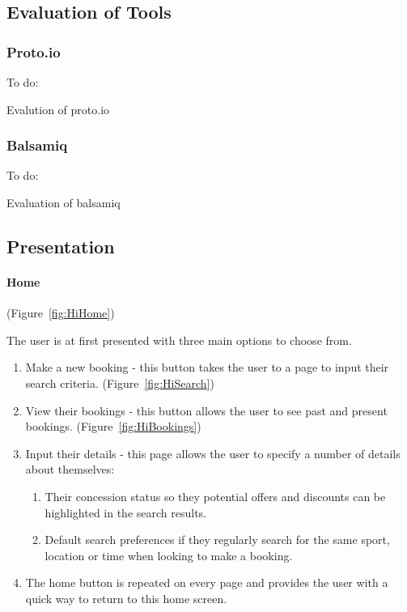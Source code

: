 


\subsection{Evaluation of Tools}


\subsubsection{Proto.io}



To do:

Evalution of proto.io


\subsubsection{Balsamiq}



To do:

Evaluation of balsamiq


\subsection{Presentation}


\paragraph{Home }

(Figure~\ref{fig:HiHome})


The user is at first presented with three main options to choose from.
\begin{enumerate}
	\item Make a new booking - this button takes the user to a page to input
	      their search criteria. (Figure~\ref{fig:HiSearch})
	\item View their bookings - this button allows the user to see past and
	      present bookings. (Figure~\ref{fig:HiBookings})
	\item Input their details - this page allows the user to specify a number
	      of details about themselves:
	      
	      \begin{enumerate}
	      	\item Their concession status so they potential offers and discounts can
	      	      be highlighted in the search results.
	      	\item Default search preferences if they regularly search for the same sport,
	      	      location or time when looking to make a booking.
	      \end{enumerate}
	\item The home button is repeated on every page and provides the user with
	      a quick way to return to this home screen.
\end{enumerate}

